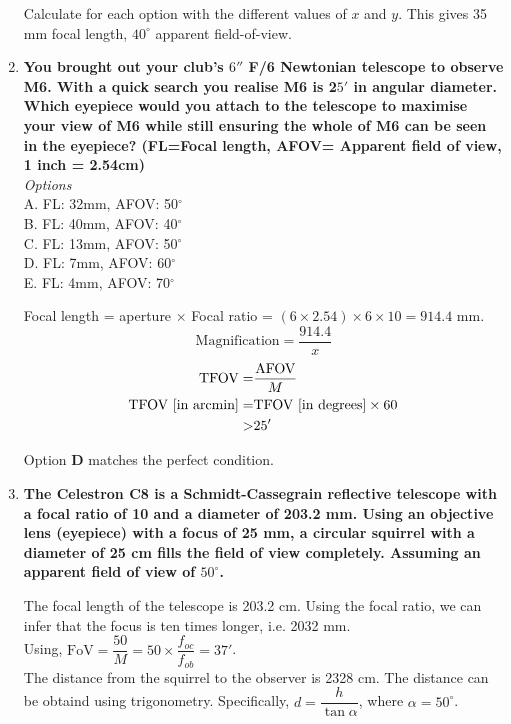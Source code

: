 \documentclass[a4paper,12pt]{extarticle}
\begin{document}
\begin{enumerate}
\begin{sol}
Calculate for each option with the different values of $x$ and $y$. This gives 35 mm focal length, $40^\circ$ apparent field-of-view.
\end{sol}
\item \textbf{You brought out your club’s $6''$ F/6 Newtonian telescope to observe M6. With a quick search you realise M6 is 2$5'$ in angular diameter. Which eyepiece would you attach to the telescope to maximise your view of M6 while still ensuring the whole of M6 can be seen in the eyepiece? (FL=Focal length, AFOV= Apparent field of view, 1 inch = 2.54cm)}	\\

\textit{Options}\\
A. FL: 32mm, AFOV: 50$^\circ$\\
B. FL: 40mm, AFOV: 40$^\circ$\\
C. FL: 13mm, AFOV: 50$^\circ$\\
D. FL: 7mm, AFOV: 60$^\circ$\\
E. FL: 4mm, AFOV: 70$^\circ$

\begin{sol}
Focal length = aperture $\times$ Focal ratio = $(6\times 2.54) \times 6 \times 10  = 914.4$ mm.
\[\text{Magnification} =\frac{914.4}{x}\]
\begin{align*}
	\text{TFOV}=&\frac{\rm AFOV}{M}\\
	\text{TFOV [in arcmin]}=&\text{TFOV [in degrees]} \times 60\\
	>& 25'
\end{align*}

Option \textbf{D} matches the perfect condition.	
\end{sol}



\item \textbf{The Celestron C8 is a Schmidt-Cassegrain reflective telescope with a focal ratio of 10 and a diameter of 203.2 mm. Using an objective lens (eyepiece) with a focus of 25 mm, a circular squirrel with a diameter of 25 cm fills the field of view completely. Assuming an apparent field of view of $50^\circ$.}
\begin{sol}
The focal length of the telescope is 203.2 cm. Using the focal ratio, we can infer that the focus is ten times longer, i.e.
2032 mm.\\

Using, $\text{FoV} =\dfrac{50}{M}=50\times \dfrac{f_{oc}}{f_{ob}}=37'$.\\

The distance from the squirrel to the observer is 2328 cm. The distance can be obtaind using trigonometry. Specifically, $d=\dfrac{h}{\tan \alpha}$, where $\alpha = 50^\circ$.\\


\end{sol}
\end{enumerate}
\end{document}
